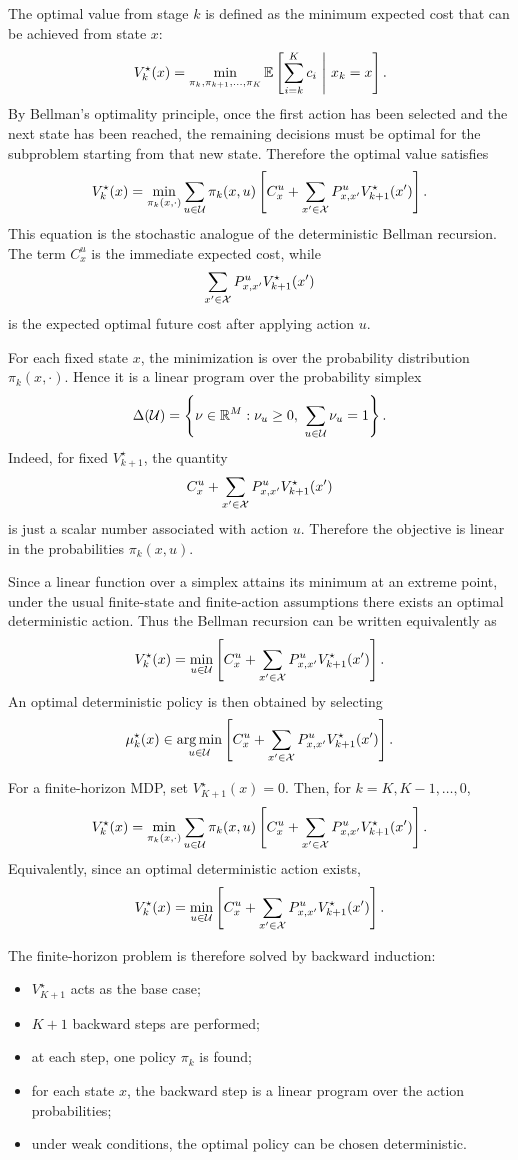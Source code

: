 The optimal value from stage \(k\) is defined as the minimum expected cost that can be achieved
from state \(x\):
\[
V_k^\star(x)
=
\min_{\pi_k,\pi_{k+1},\dots,\pi_K}
\mathbb{E}\left[
\sum_{i=k}^{K}c_i
\ \middle|\ x_k=x
\right].
\]
By Bellman's optimality principle, once the first action has been selected and the next state has
been reached, the remaining decisions must be optimal for the subproblem starting from that
new state. Therefore the optimal value satisfies
\[
V_k^\star(x)
=
\min_{\pi_k(x,\cdot)}
\sum_{u\in\mathcal{U}}\pi_k(x,u)
\left[
C_x^u
+
\sum_{x'\in\mathcal{X}}P^u_{x,x'}V_{k+1}^\star(x')
\right].
\]
This equation is the stochastic analogue of the deterministic Bellman recursion. The term
\(C_x^u\) is the immediate expected cost, while
\[
\sum_{x'\in\mathcal{X}}P^u_{x,x'}V_{k+1}^\star(x')
\]
is the expected optimal future cost after applying action \(u\).

For each fixed state \(x\), the minimization is over the probability distribution
\(\pi_k(x,\cdot)\). Hence it is a linear program over the probability simplex
\[
\Delta(\cU)
=
\left\{
\nu\in\R^M:
\nu_u\ge 0,\ 
\sum_{u\in\cU}\nu_u=1
\right\}.
\]
Indeed, for fixed \(V_{k+1}^\star\), the quantity
\[
C_x^u+\sum_{x'\in\mathcal{X}}P^u_{x,x'}V_{k+1}^\star(x')
\]
is just a scalar number associated with action \(u\). Therefore the objective is linear in the
probabilities \(\pi_k(x,u)\).

Since a linear function over a simplex attains its minimum at an extreme point, under the usual
finite-state and finite-action assumptions there exists an optimal deterministic action. Thus the
Bellman recursion can be written equivalently as
\[
V_k^\star(x)
=
\min_{u\in\mathcal{U}}
\left[
C_x^u
+
\sum_{x'\in\mathcal{X}}P^u_{x,x'}V_{k+1}^\star(x')
\right].
\]
An optimal deterministic policy is then obtained by selecting
\[
\mu_k^\star(x)
\in
\operatorname*{arg\,min}_{u\in\mathcal{U}}
\left[
C_x^u
+
\sum_{x'\in\mathcal{X}}P^u_{x,x'}V_{k+1}^\star(x')
\right].
\]

\begin{theorembox}
For a finite-horizon MDP, set \(V_{K+1}^\star(x)=0\). Then, for
\(k=K,K-1,\dots,0\),
\[
V_k^\star(x)
=
\min_{\pi_k(x,\cdot)}
\sum_{u\in\mathcal{U}}\pi_k(x,u)
\left[
C_x^u
+
\sum_{x'\in\mathcal{X}}P^u_{x,x'}V_{k+1}^\star(x')
\right].
\]
Equivalently, since an optimal deterministic action exists,
\[
V_k^\star(x)
=
\min_{u\in\mathcal{U}}
\left[
C_x^u
+
\sum_{x'\in\mathcal{X}}P^u_{x,x'}V_{k+1}^\star(x')
\right].
\]
\end{theorembox}

The finite-horizon problem is therefore solved by backward induction:
\begin{itemize}
    \item \(V_{K+1}^\star\) acts as the base case;
    \item \(K+1\) backward steps are performed;
    \item at each step, one policy \(\pi_k\) is found;
    \item for each state \(x\), the backward step is a linear program over the action
    probabilities;
    \item under weak conditions, the optimal policy can be chosen deterministic.
\end{itemize}


